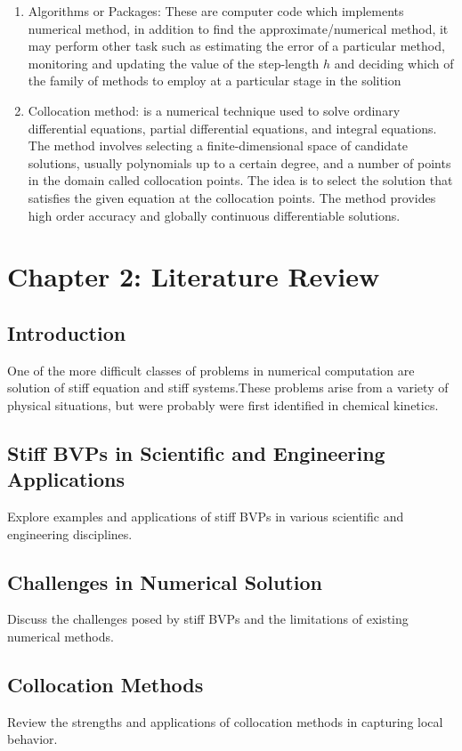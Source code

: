 \documentclass{report}
\begin{document}
\begin{enumerate}
  \item Algorithms or Packages: These are computer code which implements numerical method, in addition to find the approximate/numerical method, it may perform other task such as estimating the error of a particular method, monitoring and updating the value of the step-length $h$ and deciding which of the family of methods to employ at a particular stage in the solition \cite{lambert1977} 

  \item Collocation method:  is a numerical technique used to solve ordinary differential equations, partial differential equations, and integral equations. The method involves selecting a finite-dimensional space of candidate solutions, usually polynomials up to a certain degree, and a number of points in the domain called collocation points. The idea is to select the solution that satisfies the given equation at the collocation points. The method provides high order accuracy and globally continuous differentiable solutions. \cite{enwiki:1166346639}
\end{enumerate}

\section{Chapter 2: Literature Review}

\subsection{Introduction}
One of the more difficult classes of problems in numerical computation are solution of stiff equation and stiff systems.These problems arise from a variety of physical situations, but were probably were first identified in chemical kinetics.

\subsection{Stiff BVPs in Scientific and Engineering Applications}
Explore examples and applications of stiff BVPs in various scientific and engineering disciplines.

\subsection{Challenges in Numerical Solution}
Discuss the challenges posed by stiff BVPs and the limitations of existing numerical methods.

\subsection{Collocation Methods}
Review the strengths and applications of collocation methods in capturing local behavior.
\end{document}
